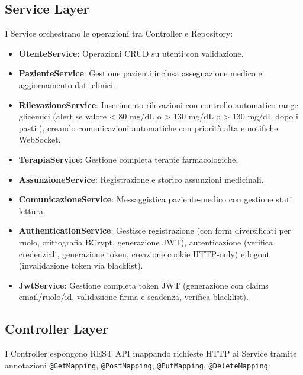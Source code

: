 \documentclass{report}
\begin{document}
\subsection{Service Layer}
I Service orchestrano le operazioni tra Controller e Repository:
\begin{itemize}
    \item \textbf{UtenteService}: Operazioni CRUD su utenti con validazione.

    \item \textbf{PazienteService}: Gestione pazienti inclusa assegnazione medico e aggiornamento dati clinici.

    \item \textbf{RilevazioneService}: Inserimento rilevazioni con controllo automatico range glicemici (alert se valore < 80 mg/dL o > 130 mg/dL o > 130 mg/dL dopo i pasti ), creando comunicazioni automatiche con priorità alta e notifiche WebSocket.

    \item \textbf{TerapiaService}: Gestione completa terapie farmacologiche.

    \item \textbf{AssunzioneService}: Registrazione e storico assunzioni medicinali.

    \item \textbf{ComunicazioneService}: Messaggistica paziente-medico con gestione stati lettura.

    \item \textbf{AuthenticationService}: Gestisce registrazione (con form diversificati per ruolo, crittografia BCrypt, generazione JWT), autenticazione (verifica credenziali, generazione token, creazione cookie HTTP-only) e logout (invalidazione token via blacklist).

    \item \textbf{JwtService}: Gestione completa token JWT (generazione con claims email/ruolo/id, validazione firma e scadenza, verifica blacklist).

\end{itemize}


\subsection{Controller Layer}

I Controller espongono REST API mappando richieste HTTP ai Service tramite annotazioni \texttt{@GetMapping}, 
\texttt{@PostMapping}, \texttt{@PutMapping}, \texttt{@DeleteMapping}:
\\
\end{document}
